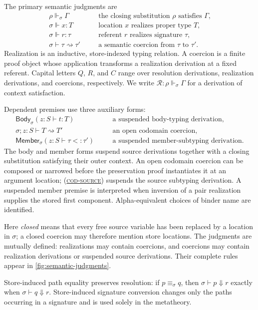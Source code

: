 \documentclass[acmsmall,screen,nonacm]{acmart}
\newcommand{\ruleref}[1]{%
  \textsc{(\hyperref[rule:#1]{#1})}}
\newcommand{\resolve}{\Downarrow}
\newcommand{\realizes}{\Vdash}
\newcommand{\coerce}{\mathrel{\rightsquigarrow}}
\newcommand{\bodycl}[5]{%
  \mathsf{Body}_{#1}(#2\!:\!#3\vdash #4:#5)}
\newcommand{\membercl}[5]{%
  \mathsf{Member}_{#1}(#2\!:\!#3\vdash #4<:#5)}
\begin{document}
The primary semantic judgments are
\[
\begin{array}{lll}
\rho\realizes_\sigma\Gamma
  &\quad&\text{the closing substitution \(\rho\) satisfies \(\Gamma\),}\\
\sigma\realizes x:T
  &&\text{location \(x\) realizes proper type \(T\),}\\
\sigma\realizes r:\tau
  &&\text{referent \(r\) realizes signature \(\tau\),}\\
\sigma\vdash\tau\coerce\tau'
  &&\text{a semantic coercion from \(\tau\) to \(\tau'\).}
\end{array}
\]
Realization is an inductive, store-indexed typing relation. A coercion is a
finite proof object whose application transforms a realization derivation at
a fixed referent. Capital letters \(Q\), \(R\), and \(C\) range over
resolution derivations, realization derivations, and coercions, respectively.
We write \(\mathcal R:\rho\realizes_\sigma\Gamma\) for a derivation of context
satisfaction.

Dependent premises use three auxiliary forms:
\[
\begin{array}{lll}
\bodycl{\sigma}{z}{S}{t}{T}
  &\quad&\text{a suspended body-typing derivation,}\\
\sigma;z:S\vdash T\coerce T'
  &&\text{an open codomain coercion,}\\
\membercl{\sigma}{z}{S}{\tau}{\tau'}
  &&\text{a suspended member-subtyping derivation.}
\end{array}
\]
The body and member forms suspend source derivations together with a closing
substitution satisfying their outer context. An open codomain coercion can be
composed or narrowed before the preservation proof instantiates it at an
argument location; \ruleref{cod-source} suspends the source subtyping derivation. A
suspended member premise is interpreted when inversion of a pair realization
supplies the stored first component. Alpha-equivalent choices of binder name
are identified.

Here \emph{closed} means that every free source variable has been replaced
by a location in \(\sigma\); a closed coercion may therefore mention store
locations. The judgments are mutually defined: realizations may contain
coercions, and coercions may contain realization derivations or suspended
source derivations. Their complete rules appear in
\cref{fig:semantic-judgments}.

Store-induced path equality preserves resolution: if
\(p\equiv_\sigma q\), then
\(\sigma\vdash p\resolve r\) exactly when
\(\sigma\vdash q\resolve r\). Store-induced signature conversion changes only
the paths occurring in a signature and is used solely in the metatheory.
\end{document}
